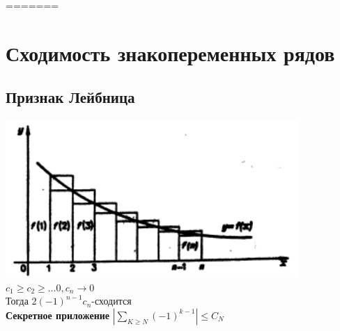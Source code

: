 \documentclass[12pt, a4paper]{article}
\begin{document}
	
	
=======
         \section{Сходимость  знакопеременных рядов}
         
         \subsection{Признак Лейбница}
        \includegraphics{leidn.png}
         $ c_1 \geq c_2 \geq \dots 0 , c_n \rightarrow 0 $\\
         Тогда $ 2(-1)^{n-1}c_n $-сходится\\ 
         \textbf{Секретное приложение}
         $ |\sum_{K \geq N}(-1)^{k-1}| \leq C_N $\\
         
\end{document}
